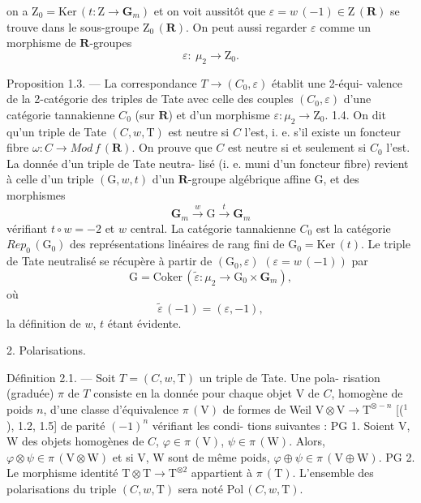 
on a $\mathrm{Z}_0 = \mathrm{Ker}\,(t : \mathrm{Z} \to \mathbf{G}_m)$ et on voit aussitôt que $\varepsilon = w\,(-1) \in \mathrm{Z}\,(\mathbf{R})$
se trouve dans le sous-groupe $\mathrm{Z}_0\,(\mathbf{R})$. On peut aussi regarder $\varepsilon$ comme
un morphisme de $\mathbf{R}$-groupes
\[ \varepsilon : \ \mu_2 \to \mathrm{Z}_0. \]

Proposition 1.3. --- La correspondance $T \to (C_0, \varepsilon)$ établit une 2-équi-%
valence de la 2-catégorie des triples de Tate avec celle des couples $(C_0, \varepsilon)$
d'une catégorie tannakienne $C_0$ (sur $\mathbf{R}$) et d'un morphisme $\varepsilon : \mu_2 \to \mathrm{Z}_0$.
1.4. On dit qu'un triple de Tate $(C, w, \mathrm{T})$ est neutre si $C$ l'est, i. e.
s'il existe un foncteur fibre $\omega : C \to \mathit{Mod\,f}\,(\mathbf{R})$. On prouve que $C$ est
neutre si et seulement si $C_0$ l'est. La donnée d'un triple de Tate neutra-%
lisé (i. e. muni d'un foncteur fibre) revient à celle d'un triple $(\mathrm{G}, w, t)$
d'un $\mathbf{R}$-groupe algébrique affine G, et des morphismes
\[ \mathbf{G}_m \xrightarrow{w} \mathrm{G} \xrightarrow{t} \mathbf{G}_m \]
vérifiant $t \circ w = -2$ et $w$ central. La catégorie tannakienne $C_0$ est la
catégorie $\mathit{Rep}_0\,(\mathrm{G}_0)$ des représentations linéaires de rang fini de $\mathrm{G}_0 = \mathrm{Ker}\,(t)$.
Le triple de Tate neutralisé se récupère à partir de $(\mathrm{G}_0, \varepsilon)$ $(\varepsilon = w\,(-1))$
par
\[ \mathrm{G} = \mathrm{Coker}\,(\tilde{\varepsilon} : \mu_2 \to \mathrm{G}_0 \times \mathbf{G}_m), \]
où
\[ \tilde{\varepsilon}\,(-1) = (\varepsilon, -1), \]
la définition de $w$, $t$ étant évidente.

2. Polarisations.

Définition 2.1. --- Soit $T = (C, w, \mathrm{T})$ un triple de Tate. Une pola-%
risation (graduée) $\pi$ de $T$ consiste en la donnée pour chaque objet V
de $C$, homogène de poids $n$, d'une classe d'équivalence $\pi\,(\mathrm{V})$ de formes
de Weil $\mathrm{V} \otimes \mathrm{V} \to \mathrm{T}^{\otimes -n}$ [(${}^1$), 1.2, 1.5] de parité $(-1)^n$ vérifiant les condi-%
tions suivantes :
PG 1. Soient V, W des objets homogènes de $C$, $\varphi \in \pi\,(\mathrm{V})$, $\psi \in \pi\,(\mathrm{W})$. Alors,
$\varphi \otimes \psi \in \pi\,(\mathrm{V} \otimes \mathrm{W})$ et si V, W sont de même poids, $\varphi \oplus \psi \in \pi\,(\mathrm{V} \oplus \mathrm{W})$.
PG 2. Le morphisme identité $\mathrm{T} \otimes \mathrm{T} \to \mathrm{T}^{\otimes 2}$ appartient à $\pi\,(\mathrm{T})$.
L'ensemble des polarisations du triple $(C, w, \mathrm{T})$ sera noté $\mathrm{Pol}\,(C, w, \mathrm{T})$.

